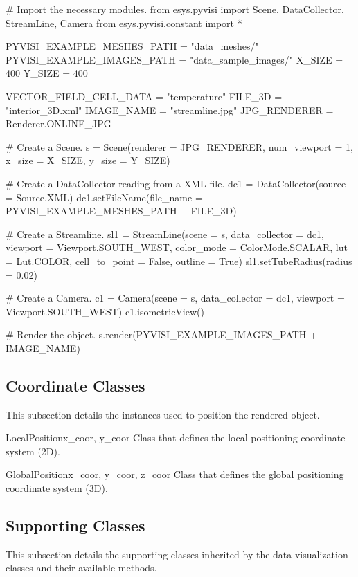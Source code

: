 \begin{python}
# Import the necessary modules.
from esys.pyvisi import Scene, DataCollector, StreamLine, Camera 
from esys.pyvisi.constant import *

PYVISI_EXAMPLE_MESHES_PATH = "data_meshes/"
PYVISI_EXAMPLE_IMAGES_PATH = "data_sample_images/"
X_SIZE = 400
Y_SIZE = 400

VECTOR_FIELD_CELL_DATA = "temperature"
FILE_3D = "interior_3D.xml"
IMAGE_NAME = "streamline.jpg"
JPG_RENDERER = Renderer.ONLINE_JPG


# Create a Scene.
s = Scene(renderer = JPG_RENDERER, num_viewport = 1, x_size = X_SIZE, 
        y_size = Y_SIZE)

# Create a DataCollector reading from a XML file.
dc1 = DataCollector(source = Source.XML)
dc1.setFileName(file_name = PYVISI_EXAMPLE_MESHES_PATH + FILE_3D)

# Create a Streamline.
sl1 = StreamLine(scene = s, data_collector = dc1,
        viewport = Viewport.SOUTH_WEST, color_mode = ColorMode.SCALAR, 
        lut = Lut.COLOR, cell_to_point = False, outline = True)
sl1.setTubeRadius(radius = 0.02)

# Create a Camera.
c1 = Camera(scene = s, data_collector = dc1, viewport = Viewport.SOUTH_WEST)
c1.isometricView()

# Render the object.
s.render(PYVISI_EXAMPLE_IMAGES_PATH + IMAGE_NAME)
\end{python}




\subsection{Coordinate Classes}
This subsection details the instances used to position the rendered object.

\begin{classdesc}{LocalPosition}{x_coor, y_coor}
Class that defines the local positioning coordinate system (2D).
\end{classdesc}

\begin{classdesc}{GlobalPosition}{x_coor, y_coor, z_coor}
Class that defines the global positioning coordinate system (3D).
\end{classdesc}




\subsection{Supporting Classes}
This subsection details the supporting classes inherited by the data 
visualization classes and their available methods. 

